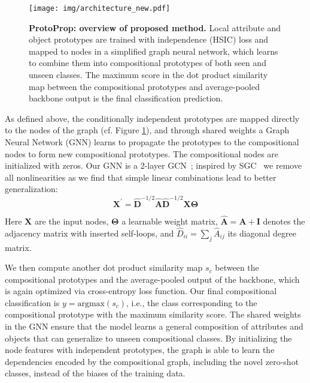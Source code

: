 \documentclass{article}
\begin{document}
\label{sec:prop}
\begin{figure}[]
    \centering
    \texttt{[image: img/architecture\_new.pdf]}
    \caption{\textbf{ProtoProp: overview of proposed method.} Local attribute and object prototypes are trained with independence (HSIC) loss and mapped to nodes in a simplified graph neural network, which learns to combine them into compositional prototypes of both seen and unseen classes. The maximum score in the dot product similarity map between the compositional prototypes and average-pooled backbone output is the final classification prediction.}
    \label{fig:arch}
    \medskip
    \small
\end{figure}

As defined above, the conditionally independent prototypes are mapped directly to the nodes of the graph (cf. Figure \ref{fig:arch}), and through shared weights a Graph Neural Network (GNN) learns to propagate the prototypes to the compositional nodes to form new compositional prototypes. The compositional nodes are initialized with zeros. Our GNN is a 2-layer GCN~\citep{kipf2017semi}; inspired by SGC~\citep{pmlr-v97-wu19e} we remove all nonlinearities as we find that simple linear combinations lead to better generalization:
%
\begin{equation}
\mathbf{X}^{\prime} = {\mathbf{\hat{D}}^{-1/2} \mathbf{\hat{A}}
\mathbf{\hat{D}}^{-1/2} } \mathbf{X} \mathbf{\Theta}
\end{equation}

Here $\textbf{X}$ are the input nodes, $\mathbf{\Theta}$ a learnable weight matrix, $\mathbf{\hat{A}} = \mathbf{A} + \mathbf{I}$ denotes the adjacency matrix with inserted self-loops, and $\hat{D}_{ii} = \sum_{j} \hat{A}_{ij}$ its diagonal degree matrix.

We then compute another dot product similarity map $s_c$ between the compositional prototypes and the average-pooled output of the backbone, which is again optimized via cross-entropy loss function. Our final compositional classification is $y = \text{argmax}(s_c)$, i.e., the class corresponding to the compositional prototype with the maximum similarity score. The shared weights in the GNN ensure that the model learns a general composition of attributes and objects that can generalize to unseen compositional classes. By initializing the node features with independent prototypes, the graph is able to learn the dependencies encoded by the compositional graph, including the novel zero-shot classes, instead of the biases of the training data.
\end{document}
